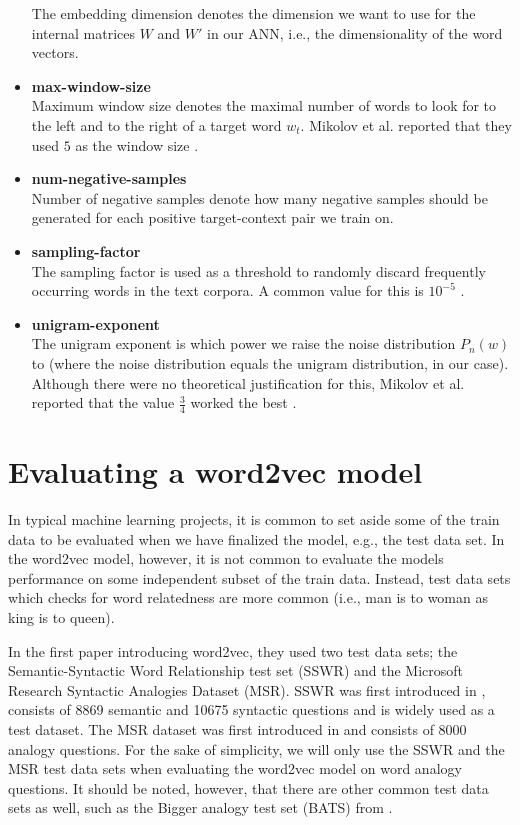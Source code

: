 \begin{itemize}
        The embedding dimension denotes the dimension we want to use for the internal matrices $W$ and $W'$ in our ANN, i.e., the dimensionality of the word vectors.
    \item \textbf{max-window-size} \\
        Maximum window size denotes the maximal number of words to look for to the left and to the right of a target word $w_t$. Mikolov et al. reported that they used $5$ as the window size \cite{mikolov2013b}.
    \item \textbf{num-negative-samples} \\
        Number of negative samples denote how many negative samples should be generated for each positive target-context pair we train on.
    \item \textbf{sampling-factor} \\
        The sampling factor is used as a threshold to randomly discard frequently occurring words in the text corpora. A common value for this is $10^{-5}$ \cite{mikolov2013b}.
    \item \textbf{unigram-exponent} \\
        The unigram exponent is which power we raise the noise distribution $P_n(w)$ to (where the noise distribution equals the unigram distribution, in our case). Although there were no theoretical justification for this, Mikolov et al. reported that the value $\frac{3}{4}$ worked the best \cite{mikolov2013b}.
\end{itemize}

\section{Evaluating a word2vec model}
\label{sec:eval-word2vec-model}
In typical machine learning projects, it is common to set aside some of the train data to be evaluated when we have finalized the model, e.g., the test data set. In the word2vec model, however, it is not common to evaluate the models performance on some independent subset of the train data. Instead, test data sets which checks for word relatedness are more common (i.e., man is to woman as king is to queen).

In the first paper introducing word2vec, they used two test data sets; the Semantic-Syntactic Word Relationship test set (SSWR) and the Microsoft Research Syntactic Analogies Dataset (MSR). SSWR was first introduced in \cite{mikolov2013a}, consists of 8869 semantic and 10675 syntactic questions and is widely used as a test dataset. The MSR dataset was first introduced in \cite{mikolov-etal-2013-linguistic} and consists of 8000 analogy questions. For the sake of simplicity, we will only use the SSWR and the MSR test data sets when evaluating the word2vec model on word analogy questions. It should be noted, however, that there are other common test data sets as well, such as the Bigger analogy test set (BATS) from \cite{gladkova-etal-2016-analogy}.

